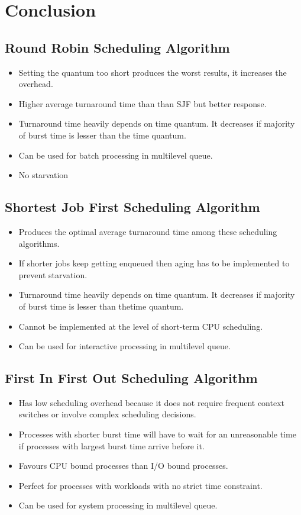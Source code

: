 \documentclass{article}
\begin{document}
\clearpage
\newpage
\section{Conclusion}
\subsection{Round Robin Scheduling Algorithm}
\begin{itemize}
  \item Setting the quantum too short produces the worst results, it increases the overhead.
  \item Higher average turnaround time than than SJF but better response.
  \item Turnaround time heavily depends on time quantum. It decreases if majority of burst time is lesser than the time quantum.
  \item Can be used for batch processing in multilevel queue.
  \item No starvation
\end{itemize}

\subsection{Shortest Job First Scheduling Algorithm}
\begin{itemize}
  \item Produces the optimal average turnaround time among these scheduling algorithms.
  \item If shorter jobs keep getting enqueued then aging has to be implemented to prevent starvation.
  \item Turnaround time heavily depends on time quantum. It decreases if majority of burst time is lesser than thetime quantum.
  \item Cannot be implemented at the level of short-term CPU scheduling.
  \item Can be used for interactive processing in multilevel queue.
\end{itemize}

\subsection{First In First Out Scheduling Algorithm}
\begin{itemize}
  \item Has low scheduling overhead because it does not require frequent context switches or involve complex scheduling decisions.
  \item Processes with shorter burst time will have to wait for an unreasonable time if processes with largest burst time arrive before it.
  \item Favours CPU bound processes than I/O bound processes.
  \item Perfect for processes with workloads with no strict time constraint.
  \item Can be used for system processing in multilevel queue.
\end{itemize}
\end{document}
